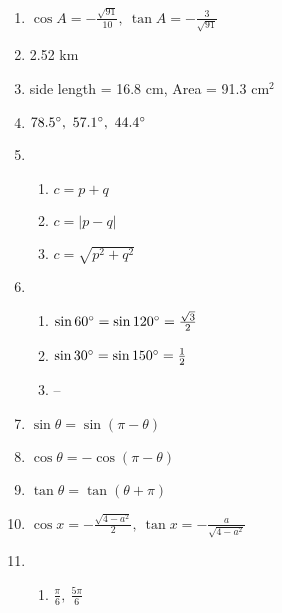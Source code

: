 \documentclass{article}
\begin{document}
\begin{enumerate}
\item $\cos{A} = -\frac{\sqrt{91}}{10}, \ \tan{A} = -\frac{3}{\sqrt{91}}$

\item 2.52 km

\item side length = 16.8 cm, Area = 91.3 cm$^2$

\item $78.5 \degree, \ 57.1 \degree, \ 44.4 \degree$

\item

	\begin{enumerate}
	
	\item $c = p + q$
	
	\item $c = |p - q|$
	
	\item $c = \sqrt{p^2 + q^2}$
	
	\end{enumerate}
	
\item

	\begin{enumerate}
	
	\item $\sin{60 \degree} = \sin{120 \degree} = \frac{\sqrt{3}}{2}$
	
	\item $\sin{30 \degree} = \sin{150 \degree} = \frac{1}{2}$
	
	\item --
	
	\end{enumerate}
	
\item $\sin{\theta} = \sin{(\pi - \theta)}$

\item $\cos{\theta} = -\cos{(\pi - \theta)}$

\item $\tan{\theta} = \tan{(\theta + \pi)}$

\item $\cos{x} = -\frac{\sqrt{4 - a^2}}{2}, \ \tan{x} = -\frac{a}{\sqrt{4 - a^2}}$

\item 

	\begin{enumerate}
	
	\item $\frac{\pi}{6}, \ \frac{5 \pi}{6}$
	

\end{enumerate}
\end{enumerate}
\end{document}
